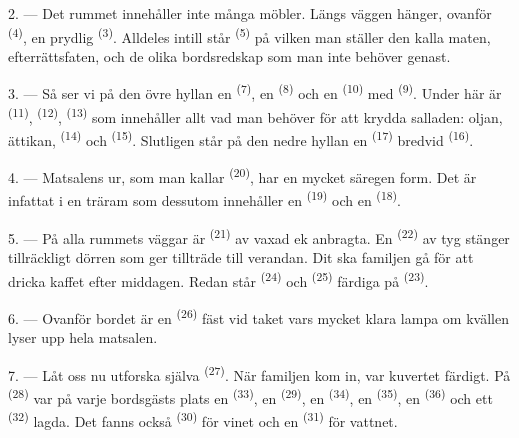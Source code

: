 2. --- Det rummet innehåller inte många möbler. Längs väggen hänger, ovanför
 \textsuperscript{(4)}, en prydlig 
\textsuperscript{(3)}. Alldeles intill står  \textsuperscript{(5)} på vilken
man ställer den kalla maten, efterrättsfaten, och de olika bordsredskap som man inte behöver
genast.

3. --- Så ser vi på den övre hyllan en  \textsuperscript{(7)}, en
 \textsuperscript{(8)} och en
 \textsuperscript{(10)} med  \textsuperscript{(9)}.
Under här är  \textsuperscript{(11)},  \textsuperscript{(12)},
 \textsuperscript{(13)} som innehåller allt vad man behöver för att
krydda salladen: oljan, ättikan,
 \textsuperscript{(14)} och 
\textsuperscript{(15)}. Slutligen står på den nedre hyllan en 
\textsuperscript{(17)} bredvid  \textsuperscript{(16)}.

4. --- Matsalens ur, som man kallar  \textsuperscript{(20)}, har en mycket
säregen form. Det är infattat i en träram som dessutom innehåller en
 \textsuperscript{(19)} och en 
\textsuperscript{(18)}.

\VUsaut{4.6mm}
\VUsaut{3.0mm}

5. --- På alla rummets väggar är  \textsuperscript{(21)} av vaxad ek
anbragta. En  \textsuperscript{(22)} av tyg stänger tillräckligt dörren som
ger tillträde till verandan. Dit ska familjen gå för att dricka kaffet efter middagen. Redan
står  \textsuperscript{(24)} och  \textsuperscript{(25)}
färdiga på
 \textsuperscript{(23)}.

6. --- Ovanför bordet är en  \textsuperscript{(26)} fäst vid taket vars
mycket klara lampa om kvällen lyser upp hela matsalen.

7. --- Låt oss nu utforska själva  \textsuperscript{(27)}. När familjen kom
in, var kuvertet färdigt. På  \textsuperscript{(28)} var på varje bordsgästs
plats en  \textsuperscript{(33)}, en  \textsuperscript{(29)},
en
 \textsuperscript{(34)}, en 
\textsuperscript{(35)}, en  \textsuperscript{(36)} och ett
 \textsuperscript{(32)} lagda. Det fanns också 
\textsuperscript{(30)} för vinet och en  \textsuperscript{(31)} för vattnet.

